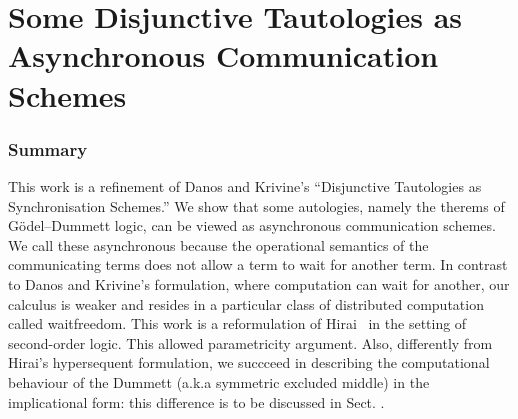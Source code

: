 \chapter{Some Disjunctive Tautologies as
  Asynchronous Communication Schemes}




% 


\newcommand{\ltypes}[1]{\mathsf{Ltypes}({#1})}
\newcommand{\lvars}[1]{\mathsf{Lvars}({#1})}
\newcommand{\rtypes}[1]{\mathsf{Rtypes}({#1})}
\newcommand{\rterms}[1]{\mathsf{Rterms}({#1})}

\subsection{Summary}
This work is a refinement of
Danos and Krivine's ``Disjunctive Tautologies as
Synchronisation Schemes.''
We show that some autologies,
namely the therems of G\"odel--Dummett logic,
can be viewed as asynchronous communication schemes.
We call these asynchronous because the operational semantics
of the communicating terms does not allow a term to wait for another
term.
In contrast to Danos and Krivine's  formulation,
where computation can wait for another,
our calculus is weaker and resides in a particular class of
distributed computation called waitfreedom.
This work is a reformulation of Hirai~ in the setting of
second-order logic.
This allowed parametricity argument.
Also, differently from Hirai's  hypersequent formulation,
we succceed in describing the computational behaviour of the Dummett
(a.k.a symmetric excluded middle) in the implicational form: this
difference is to be discussed in Sect. .




